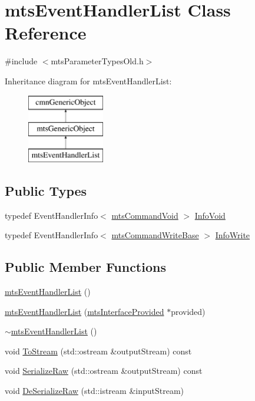 \hypertarget{classmts_event_handler_list}{}\section{mts\+Event\+Handler\+List Class Reference}
\label{classmts_event_handler_list}


{\ttfamily \#include $<$mts\+Parameter\+Types\+Old.\+h$>$}

Inheritance diagram for mts\+Event\+Handler\+List\+:\begin{figure}[H]
\begin{center}
\leavevmode
\includegraphics[height=3.000000cm]{db/dfa/classmts_event_handler_list}
\end{center}
\end{figure}
\subsection*{Public Types}
\begin{DoxyCompactItemize}
\item 
typedef Event\+Handler\+Info$<$ \hyperlink{classmts_command_void}{mts\+Command\+Void} $>$ \hyperlink{classmts_event_handler_list_a7b977bcaba00a2616c48b250d02d53d5}{Info\+Void}
\item 
typedef Event\+Handler\+Info$<$ \hyperlink{classmts_command_write_base}{mts\+Command\+Write\+Base} $>$ \hyperlink{classmts_event_handler_list_ac4f93c3df99ddcff2ecc44e52f76ffc8}{Info\+Write}
\end{DoxyCompactItemize}
\subsection*{Public Member Functions}
\begin{DoxyCompactItemize}
\item 
\hyperlink{classmts_event_handler_list_ad8252a65bae0b9e59c5051fcf0ffd5b0}{mts\+Event\+Handler\+List} ()
\item 
\hyperlink{classmts_event_handler_list_a30bb6895d7e72e2e9ff372064fcd88ba}{mts\+Event\+Handler\+List} (\hyperlink{classmts_interface_provided}{mts\+Interface\+Provided} $\ast$provided)
\item 
\hyperlink{classmts_event_handler_list_a824c64336b63056f32734fe0ad651323}{$\sim$mts\+Event\+Handler\+List} ()
\item 
void \hyperlink{classmts_event_handler_list_aeb24dcca4345b9b2dc1f3fdf89e85b8a}{To\+Stream} (std\+::ostream \&output\+Stream) const 
\item 
void \hyperlink{classmts_event_handler_list_ae7391045273ca992ba780946a0721246}{Serialize\+Raw} (std\+::ostream \&output\+Stream) const 
\item 
void \hyperlink{classmts_event_handler_list_ab54135f1691b0ea947d18e50b5e69738}{De\+Serialize\+Raw} (std\+::istream \&input\+Stream)
\end{DoxyCompactItemize}
